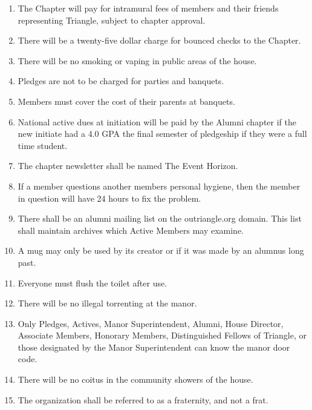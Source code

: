 \begin{enumerate}
\item The Chapter will pay for intramural fees of members and their friends representing Triangle, subject to chapter approval. 
\item There will be a twenty-five dollar charge for bounced checks to the Chapter. 
\item There will be no smoking or vaping in public areas of the house.  
\item Pledges are not to be charged for parties and banquets.  
\item Members must cover the cost of their parents at banquets.  
\item National active dues at initiation will be paid by the Alumni chapter if the new initiate had a 4.0 GPA the final semester of pledgeship if they were a full time student.
\item The chapter newsletter shall be named The Event Horizon. 
\item If a member questions another members personal hygiene, then the member in question will have 24 hours to fix the problem.
\item There shall be an alumni mailing list on the outriangle.org domain. This list shall maintain archives which Active Members may examine.
\item A mug may only be used by its creator or if it was made by an alumnus long past.
\item Everyone must flush the toilet after use.
\item There will be no illegal torrenting at the manor.
\item Only Pledges, Actives, Manor Superintendent, Alumni, House Director, Associate Members, Honorary Members, Distinguished Fellows of Triangle, or those designated by the Manor Superintendent can know the manor door code.
\item There will be no coitus in the community showers of the house.
\item The organization shall be referred to as a fraternity, and not a frat.
\end{enumerate}
